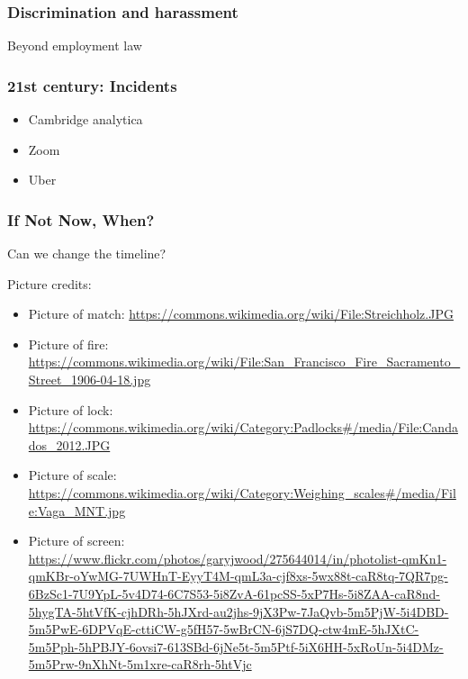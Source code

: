 \begin{frame}[fragile]
\frametitle{Discrimination and harassment}

Beyond employment law

\end{frame}

\begin{frame}[fragile]
\frametitle{21st century: Incidents}

\begin{itemize}
\item Cambridge analytica
\item Zoom
\item Uber
\end{itemize}

\end{frame}

\begin{frame}[fragile]
\frametitle{If Not Now, When?}

Can we change the timeline?

\end{frame}


Picture credits:

\begin{itemize}
\item Picture of match: \url{https://commons.wikimedia.org/wiki/File:Streichholz.JPG}
\item Picture of fire: \url{https://commons.wikimedia.org/wiki/File:San_Francisco_Fire_Sacramento_Street_1906-04-18.jpg}
\item Picture of lock: \url{https://commons.wikimedia.org/wiki/Category:Padlocks#/media/File:Candados_2012.JPG}
\item Picture of scale: \url{https://commons.wikimedia.org/wiki/Category:Weighing_scales#/media/File:Vaga_MNT.jpg}
\item Picture of screen: \url{https://www.flickr.com/photos/garyjwood/275644014/in/photolist-qmKn1-qmKBr-oYwMG-7UWHnT-EyyT4M-qmL3a-cjf8xs-5wx88t-caR8tq-7QR7pg-6BzSc1-7U9YpL-5v4D74-6C7S53-5i8ZvA-61pcSS-5xP7Hs-5i8ZAA-caR8nd-5hygTA-5htVfK-cjhDRh-5hJXrd-au2jhs-9jX3Pw-7JaQvb-5m5PjW-5i4DBD-5m5PwE-6DPVqE-cttiCW-g5fH57-5wBrCN-6jS7DQ-ctw4mE-5hJXtC-5m5Pph-5hPBJY-6ovsi7-613SBd-6jNe5t-5m5Ptf-5iX6HH-5xRoUn-5i4DMz-5m5Prw-9nXhNt-5m1xre-caR8rh-5htVjc}
\end{itemize}


